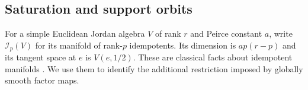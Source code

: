 
\subsection{Saturation and support orbits}
For a simple Euclidean Jordan algebra $V$ of rank $r$ and Peirce
constant $a$, write $\mathcal I_p(V)$ for its manifold of rank-$p$
idempotents. Its dimension is $ap(r-p)$ and its tangent space at $e$
is $V(e,1/2)$. These are classical facts about idempotent manifolds
\cite{FK1994,Nomura1994}. We use them to identify the additional restriction
imposed by globally smooth factor maps.

